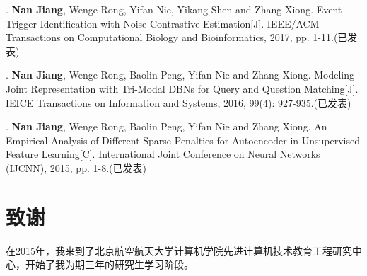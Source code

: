 \documentclass[master,openright,twoside,color]{buaathesis}
\begin{document}
. \textbf{Nan Jiang}, Wenge Rong, Yifan Nie, Yikang Shen and Zhang Xiong. Event Trigger Identification with Noise Contrastive Estimation[J]. IEEE/ACM Transactions on Computational Biology and Bioinformatics, 2017, pp. 1-11.(已发表)

. \textbf{Nan Jiang}, Wenge Rong, Baolin Peng, Yifan Nie and Zhang Xiong. Modeling Joint Representation with Tri-Modal DBNs for Query and Question Matching[J]. IEICE Transactions on Information and Systems, 2016, 99(4): 927-935.(已发表)

. \textbf{Nan Jiang}, Wenge Rong, Baolin Peng, Yifan Nie and Zhang Xiong. An Empirical Analysis of Different Sparse Penalties
for Autoencoder in Unsupervised Feature Learning[C]. International Joint Conference on Neural Networks (IJCNN), 2015, pp. 1-8.(已发表)

\chapter{致\quad 谢}
在2015年，我来到了北京航空航天大学计算机学院先进计算机技术教育工程研究中心，开始了我为期三年的研究生学习阶段。
\end{document}
